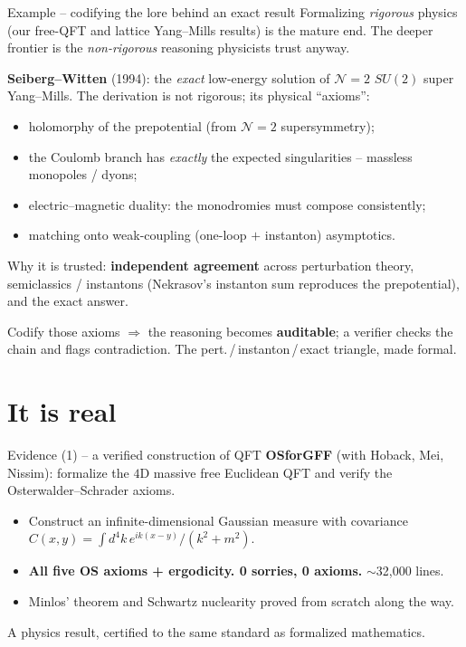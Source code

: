 \documentclass[aspectratio=169,xcolor=dvipsnames]{beamer}
\begin{document}
\begin{frame}{Example -- codifying the lore behind an exact result}
Formalizing \emph{rigorous} physics (our free-QFT and lattice Yang--Mills results) is the
mature end.  The deeper frontier is the \emph{non-rigorous} reasoning physicists trust anyway. \pause
\medskip

\textbf{Seiberg--Witten} (1994): the \emph{exact} low-energy solution of $\mathcal{N}=2$
$SU(2)$ super Yang--Mills.  The derivation is not rigorous; its physical ``axioms'':
\begin{itemize}
  \item holomorphy of the prepotential (from $\mathcal{N}=2$ supersymmetry);
  \item the Coulomb branch has \emph{exactly} the expected singularities -- massless
        monopoles / dyons;
  \item electric--magnetic duality: the monodromies must compose consistently;
  \item matching onto weak-coupling (one-loop $+$ instanton) asymptotics.
\end{itemize} \pause
\smallskip
Why it is trusted: \textbf{independent agreement} across perturbation theory, semiclassics /
instantons (Nekrasov's instanton sum reproduces the prepotential), and the exact answer.
\smallskip

Codify those axioms $\Rightarrow$ the reasoning becomes \textbf{auditable}; a verifier checks
the chain and flags contradiction.  The pert.\,/\,instanton\,/\,exact triangle, made formal.
\end{frame}

\section{It is real}
\begin{frame}{Evidence (1) -- a verified construction of QFT}
\textbf{OSforGFF} (with Hoback, Mei, Nissim): formalize the $4$D massive free Euclidean
QFT and verify the Osterwalder--Schrader axioms.
\begin{itemize}
  \item Construct an infinite-dimensional Gaussian measure with covariance
        $C(x,y)=\int \! d^4k\, e^{ik(x-y)}/(k^2+m^2)$.
  \item \textbf{All five OS axioms + ergodicity. 0 sorries, 0 axioms.} $\sim$32{,}000 lines.
  \item Minlos' theorem and Schwartz nuclearity proved from scratch along the way.
\end{itemize} \pause
\smallskip
A physics result, certified to the same standard as formalized mathematics.
\end{frame}
\end{document}
